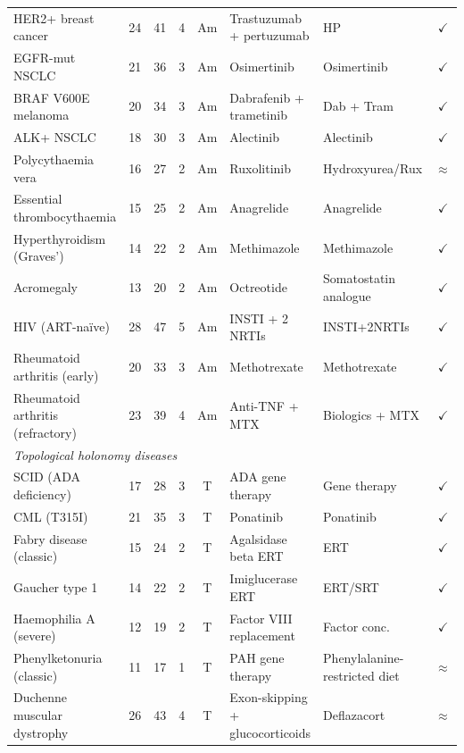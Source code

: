 \begin{table}[htbp]
\begin{tabular}{p{3.2cm}ccccllc}
HER2+ breast cancer            & 24 & 41 & 4 & Am & Trastuzumab + pertuzumab & HP & $\checkmark$ \\
EGFR-mut NSCLC                 & 21 & 36 & 3 & Am & Osimertinib & Osimertinib & $\checkmark$ \\
BRAF V600E melanoma            & 20 & 34 & 3 & Am & Dabrafenib + trametinib & Dab + Tram & $\checkmark$ \\
ALK+ NSCLC                     & 18 & 30 & 3 & Am & Alectinib & Alectinib & $\checkmark$ \\
Polycythaemia vera             & 16 & 27 & 2 & Am & Ruxolitinib & Hydroxyurea/Rux & $\approx$ \\
Essential thrombocythaemia     & 15 & 25 & 2 & Am & Anagrelide & Anagrelide & $\checkmark$ \\
Hyperthyroidism (Graves')      & 14 & 22 & 2 & Am & Methimazole & Methimazole & $\checkmark$ \\
Acromegaly                     & 13 & 20 & 2 & Am & Octreotide & Somatostatin analogue & $\checkmark$ \\
HIV (ART-na\"{i}ve)           & 28 & 47 & 5 & Am & INSTI + 2 NRTIs & INSTI+2NRTIs & $\checkmark$ \\
Rheumatoid arthritis (early)   & 20 & 33 & 3 & Am & Methotrexate & Methotrexate & $\checkmark$ \\
Rheumatoid arthritis (refractory)& 23 & 39 & 4 & Am & Anti-TNF + MTX & Biologics + MTX & $\checkmark$ \\
\midrule
\multicolumn{8}{l}{\textit{Topological holonomy diseases}} \\
\midrule
SCID (ADA deficiency)          & 17 & 28 & 3 & T & ADA gene therapy & Gene therapy & $\checkmark$ \\
CML (T315I)                    & 21 & 35 & 3 & T & Ponatinib & Ponatinib & $\checkmark$ \\
Fabry disease (classic)        & 15 & 24 & 2 & T & Agalsidase beta ERT & ERT & $\checkmark$ \\
Gaucher type 1                 & 14 & 22 & 2 & T & Imiglucerase ERT & ERT/SRT & $\checkmark$ \\
Haemophilia A (severe)         & 12 & 19 & 2 & T & Factor VIII replacement & Factor conc. & $\checkmark$ \\
Phenylketonuria (classic)      & 11 & 17 & 1 & T & PAH gene therapy & Phenylalanine-restricted diet & $\approx$ \\
Duchenne muscular dystrophy    & 26 & 43 & 4 & T & Exon-skipping + glucocorticoids & Deflazacort & $\approx$ \\
\bottomrule
\end{tabular}
\end{table}


